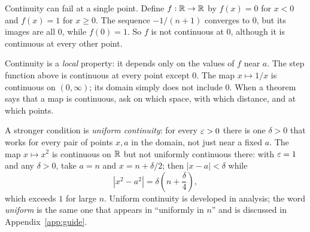 
Continuity can fail at a single point. Define $f:\mathbb R\to\mathbb R$ by $f(x)=0$ for $x<0$ and $f(x)=1$ for $x\ge0$. The sequence $-1/(n+1)$ converges to $0$, but its images are all $0$, while $f(0)=1$. So $f$ is not continuous at $0$, although it is continuous at every other point.

Continuity is a \emph{local} property: it depends only on the values of $f$ near $a$. The step function above is continuous at every point except $0$. The map $x\mapsto1/x$ is continuous on $(0,\infty)$; its domain simply does not include $0$. When a theorem says that a map is continuous, ask on which space, with which distance, and at which points.

A stronger condition is \emph{uniform continuity}: for every $\varepsilon>0$ there is one $\delta>0$ that works for every pair of points $x,a$ in the domain, not just near a fixed $a$. The map $x\mapsto x^2$ is continuous on $\mathbb R$ but not uniformly continuous there: with $\varepsilon=1$ and any $\delta>0$, take $a=n$ and $x=n+\delta/2$; then $|x-a|<\delta$ while
\[
|x^2-a^2|=\delta\left(n+\frac{\delta}{4}\right),
\]
which exceeds $1$ for large $n$. Uniform continuity is developed in analysis; the word \emph{uniform} is the same one that appears in ``uniformly in $n$'' and is discussed in Appendix~\ref{app:guide}.
